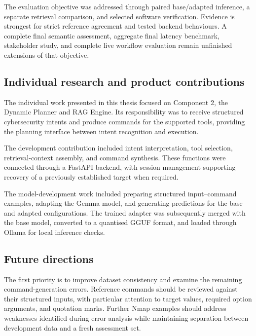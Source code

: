\documentclass[
]{article}
\begin{document}
The evaluation objective was addressed through paired base/adapted
inference, a separate retrieval comparison, and selected software
verification. Evidence is strongest for strict reference agreement and
tested backend behaviours. A complete final semantic assessment,
aggregate final latency benchmark, stakeholder study, and complete live
workflow evaluation remain unfinished extensions of that objective.

\hypertarget{individual-research-and-product-contributions}{%
\subsection{Individual research and product
contributions}\label{individual-research-and-product-contributions}}

The individual work presented in this thesis focused on Component 2, the
Dynamic Planner and RAG Engine. Its responsibility was to receive
structured cybersecurity intents and produce commands for the supported
tools, providing the planning interface between intent recognition and
execution.

The development contribution included intent interpretation, tool
selection, retrieval-context assembly, and command synthesis. These
functions were connected through a FastAPI backend, with session
management supporting recovery of a previously established target when
required.

The model-development work included preparing structured input--command
examples, adapting the Gemma model, and generating predictions for the
base and adapted configurations. The trained adapter was subsequently
merged with the base model, converted to a quantised GGUF format, and
loaded through Ollama for local inference checks.

\hypertarget{future-directions}{%
\subsection{Future directions}\label{future-directions}}

The first priority is to improve dataset consistency and examine the
remaining command-generation errors. Reference commands should be
reviewed against their structured inputs, with particular attention to
target values, required option arguments, and quotation marks. Further
Nmap examples should address weaknesses identified during error analysis
while maintaining separation between development data and a fresh
assessment set.
\end{document}
